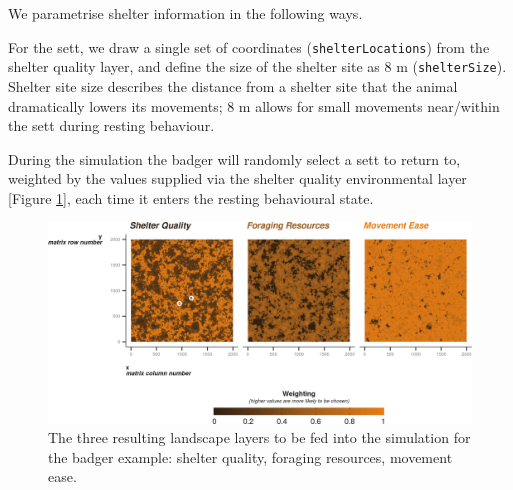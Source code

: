 \documentclass[10pt,a4paper]{article}
\newenvironment{Shaded}{}{}
\newcommand{\AttributeTok}[1]{#1}
\newcommand{\ConstantTok}[1]{#1}
\newcommand{\DecValTok}[1]{#1}
\newcommand{\FloatTok}[1]{#1}
\newcommand{\FunctionTok}[1]{#1}
\newcommand{\NormalTok}[1]{#1}
\newcommand{\OtherTok}[1]{#1}
\newcommand{\SpecialCharTok}[1]{#1}
\newcommand{\StringTok}[1]{#1}
\begin{document}
We parametrise shelter information in the following ways.

For the sett, we draw a single set of coordinates (\texttt{shelterLocations}) from the shelter quality layer, and define the size of the shelter site as 8 m (\texttt{shelterSize}).
Shelter site size describes the distance from a shelter site that the animal dramatically lowers its movements; 8 m allows for small movements near/within the sett during resting behaviour.

\begin{Shaded}
\end{Shaded}

During the simulation the badger will randomly select a sett to return to, weighted by the values supplied via the shelter quality environmental layer {[}Figure \ref{fig:BADGERlayersFigure}{]}, each time it enters the resting behavioural state.

\begin{figure}

{\centering \includegraphics{Agent-based_model_walkthrough_files/figure-latex/BADGERlayersFigure-1} 

}

\caption{The three resulting landscape layers to be fed into the simulation for the badger example: shelter quality, foraging resources, movement ease.}\label{fig:BADGERlayersFigure}
\end{figure}
\end{document}
